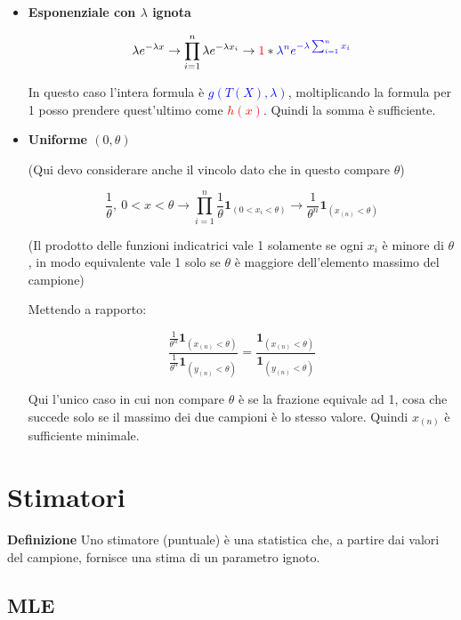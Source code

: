 \documentclass{article}
\newcommand{\df}{\noindent\textbf{Definizione} }
\begin{document}
\begin{itemize}
    \item \textbf{Esponenziale con $\lambda$ ignota} 

        $$\lambda e^{-\lambda x}\rightarrow\prod_{i=1}^n\lambda e^{-\lambda x_i}\rightarrow\textcolor{red}{1}*\textcolor{blue}{\lambda^n e^{-\lambda \sum_{i=1}^nx_i}}$$

        In questo caso l'intera formula è \textcolor{blue}{$g(T(X),\lambda)$}, moltiplicando la formula per 1 posso prendere quest'ultimo come \textcolor{red}{$h(x)$}. Quindi la somma è sufficiente.

    \item \textbf{Uniforme $(0,\theta)$} 

        (Qui devo considerare anche il vincolo dato che in questo compare $\theta$)

        $$\frac{1}{\theta},\ 0<x<\theta\rightarrow\prod_{i=1}^n\frac{1}{\theta}\mathbf{1}_{(0<x_i<\theta)}\rightarrow\frac{1}{\theta^n}\mathbf{1}_{(x_{(n)}<\theta)}$$

        (Il prodotto delle funzioni indicatrici vale 1 solamente se ogni $x_i$ è minore di $\theta$, in modo equivalente vale 1 solo se $\theta$ è maggiore dell'elemento massimo del campione)

        Mettendo a rapporto:

        \[
            \frac{\frac{1}{\theta^n}\mathbf{1}_{(x_{(n)}<\theta)}}
            {\frac{1}{\theta^n}\mathbf{1}_{(y_{(n)}<\theta)}}
            =
            \frac{\mathbf{1}_{(x_{(n)}<\theta)}}
            {\mathbf{1}_{(y_{(n)}<\theta)}} 
        \]

        Qui l'unico caso in cui non compare $\theta$ è se la frazione equivale ad 1, cosa che succede solo se il massimo dei due campioni è lo stesso valore. Quindi $x_{(n)}$ è sufficiente minimale.
    
\end{itemize}

\newpage

\section{Stimatori}

\df Uno stimatore (puntuale) è una statistica che, a partire dai valori del campione, fornisce una stima di un parametro ignoto.

\subsection{MLE}
\end{document}
